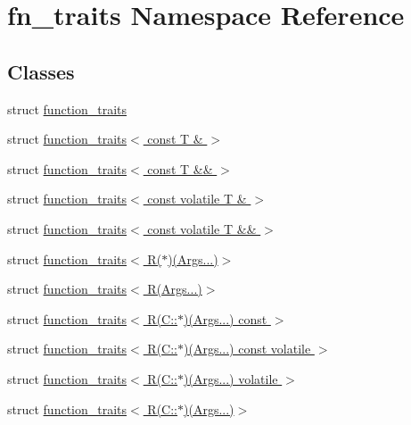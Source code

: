 \hypertarget{namespacefn__traits}{}\section{fn\+\_\+traits Namespace Reference}
\label{namespacefn__traits}
\subsection*{Classes}
\begin{DoxyCompactItemize}
\item 
struct \hyperlink{structfn__traits_1_1function__traits}{function\+\_\+traits}
\item 
struct \hyperlink{structfn__traits_1_1function__traits_3_01const_01_t_01_6_01_4}{function\+\_\+traits$<$ const T \& $>$}
\item 
struct \hyperlink{structfn__traits_1_1function__traits_3_01const_01_t_01_6_6_01_4}{function\+\_\+traits$<$ const T \&\& $>$}
\item 
struct \hyperlink{structfn__traits_1_1function__traits_3_01const_01volatile_01_t_01_6_01_4}{function\+\_\+traits$<$ const volatile T \& $>$}
\item 
struct \hyperlink{structfn__traits_1_1function__traits_3_01const_01volatile_01_t_01_6_6_01_4}{function\+\_\+traits$<$ const volatile T \&\& $>$}
\item 
struct \hyperlink{structfn__traits_1_1function__traits_3_01_r_07_5_08_07_args_8_8_8_08_4}{function\+\_\+traits$<$ R($\ast$)(\+Args...)$>$}
\item 
struct \hyperlink{structfn__traits_1_1function__traits_3_01_r_07_args_8_8_8_08_4}{function\+\_\+traits$<$ R(\+Args...)$>$}
\item 
struct \hyperlink{structfn__traits_1_1function__traits_3_01_r_07_c_1_1_5_08_07_args_8_8_8_08_01const_01_01_4}{function\+\_\+traits$<$ R(\+C\+::$\ast$)(\+Args...) const  $>$}
\item 
struct \hyperlink{structfn__traits_1_1function__traits_3_01_r_07_c_1_1_5_08_07_args_8_8_8_08_01const_01volatile_01_4}{function\+\_\+traits$<$ R(\+C\+::$\ast$)(\+Args...) const volatile $>$}
\item 
struct \hyperlink{structfn__traits_1_1function__traits_3_01_r_07_c_1_1_5_08_07_args_8_8_8_08_01volatile_01_4}{function\+\_\+traits$<$ R(\+C\+::$\ast$)(\+Args...) volatile $>$}
\item 
struct \hyperlink{structfn__traits_1_1function__traits_3_01_r_07_c_1_1_5_08_07_args_8_8_8_08_4}{function\+\_\+traits$<$ R(\+C\+::$\ast$)(\+Args...)$>$}

\end{DoxyCompactItemize}
